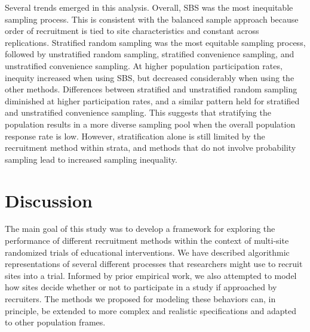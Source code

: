 \documentclass[
  man,floatsintext]{apa6}
\begin{document}
Several trends emerged in this analysis. Overall, SBS was the most inequitable sampling process. This is consistent with the balanced sample approach because order of recruitment is tied to site characteristics and constant across replications. Stratified random sampling was the most equitable sampling process, followed by unstratified random sampling, stratified convenience sampling, and unstratified convenience sampling.
At higher population participation rates, inequity increased when using SBS, but decreased considerably when using the other methods. Differences between stratified and unstratified random sampling diminished at higher participation rates, and a similar pattern held for stratified and unstratified convenience sampling. This suggests that stratifying the population results in a more diverse sampling pool when the overall population response rate is low.
However, stratification alone is still limited by the recruitment method within strata, and methods that do not involve probability sampling lead to increased sampling inequality.

\hypertarget{discussion}{%
\section*{Discussion}\label{discussion}}

The main goal of this study was to develop a framework for exploring the performance of different recruitment methods within the context of multi-site randomized trials of educational interventions. We have described algorithmic representations of several different processes that researchers might use to recruit sites into a trial. Informed by prior empirical work, we also attempted to model how sites decide whether or not to participate in a study if approached by recruiters. The methods we proposed for modeling these behaviors can, in principle, be extended to more complex and realistic specifications and adapted to other population frames.
\end{document}
